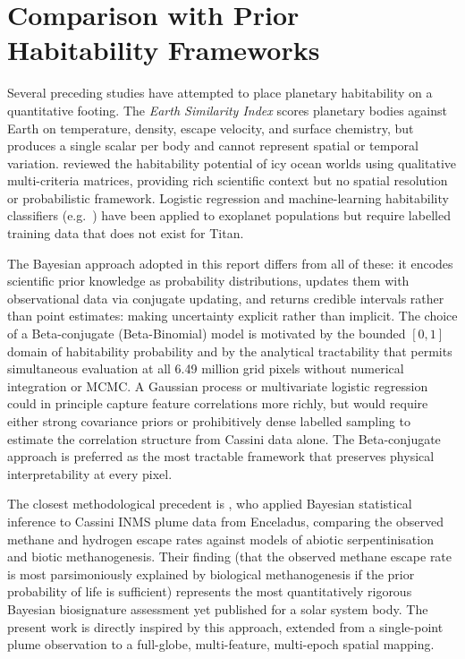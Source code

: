 
\chapter{Comparison with Prior Habitability Frameworks}
\label{app:lit_review}

Several preceding studies have attempted to place planetary habitability on
a quantitative footing.  The \textit{Earth Similarity Index}
\citep{Schulze-Makuch2011} scores planetary bodies against Earth on
temperature, density, escape velocity, and surface chemistry, but
produces a single scalar per body and cannot represent spatial or temporal
variation.  \citet{Hendrix2019} reviewed the habitability potential of
icy ocean worlds using qualitative multi-criteria matrices, providing rich
scientific context but no spatial resolution or probabilistic framework.
Logistic regression and machine-learning habitability classifiers
(e.g.\ \citealt{Saha2018, Bora2016}) have been applied to exoplanet populations
but require labelled training data that does not exist for Titan.

The Bayesian approach adopted in this report differs from all of these: it
encodes scientific prior knowledge as probability distributions, updates them
with observational data via conjugate updating, and returns credible
intervals rather than point estimates: making uncertainty explicit
rather than implicit.  The choice of a Beta-conjugate (Beta-Binomial)
model is motivated by the bounded $[0,1]$ domain of habitability
probability and by the analytical tractability that permits simultaneous
evaluation at all 6.49 million grid pixels without numerical integration
or MCMC.  A Gaussian process or multivariate logistic regression could
in principle capture feature correlations more richly, but would require
either strong covariance priors or prohibitively dense labelled sampling
to estimate the correlation structure from Cassini data alone.  The
Beta-conjugate approach is preferred as the most tractable framework
that preserves physical interpretability at every pixel.

The closest methodological precedent is \citet{Affholder2021}, who applied
Bayesian statistical inference to Cassini INMS plume data from Enceladus,
comparing the observed methane and hydrogen escape rates against models of
abiotic serpentinisation and biotic methanogenesis.  Their finding (that
the observed methane escape rate is most parsimoniously explained by
biological methanogenesis if the prior probability of life is sufficient)
represents the most quantitatively rigorous Bayesian biosignature assessment
yet published for a solar system body.  The present work is directly inspired
by this approach, extended from a single-point plume observation to a full-globe,
multi-feature, multi-epoch spatial mapping.